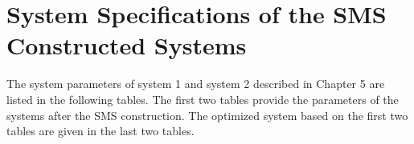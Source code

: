 \chapter{System Specifications of the SMS Constructed Systems} 
\label{apdx: chapter-5-system-spec}
\graphicspath{ {./Appendix/figures/} }  %
\captionsetup[figure]{labelfont=bf}
\captionsetup{margin=1.5em}
\captionsetup[table]{labelfont=bf}

The system parameters of system 1 and system 2 described in Chapter 5 are listed in the following tables. The first two tables provide the parameters of the systems after the SMS construction. The optimized system based on the first two tables are given in the last two tables. 

\setlength{\arrayrulewidth}{.5mm}
\setlength{\tabcolsep}{18pt}
\renewcommand{\arraystretch}{1.2}
